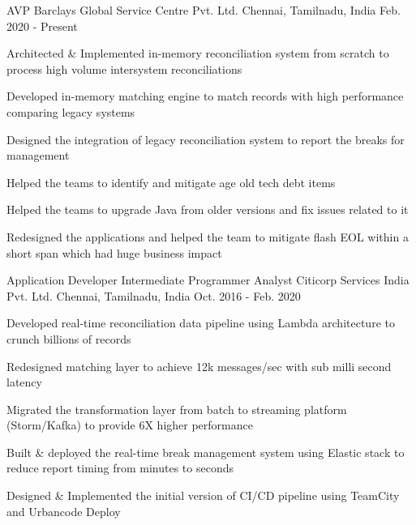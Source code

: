 

\begin{cventries}

  \cventry
    {AVP} %
    {Barclays Global Service Centre Pvt. Ltd.} %
    {Chennai, Tamilnadu, India} %
    {Feb. 2020 - Present} %
    {
      \begin{cvitems} %
        \item {Architected \& Implemented in-memory reconciliation system from scratch to process high volume intersystem reconciliations}
        \item {Developed in-memory matching engine to match records with high performance comparing legacy systems}
        \item {Designed the integration of legacy reconciliation system to report the breaks for management}
        \item {Helped the teams to identify and mitigate age old tech debt items}
        \item {Helped the teams to upgrade Java from older versions and fix issues related to it}
        \item {Redesigned the applications and helped the team to mitigate flash EOL within a short span which had huge business impact}
      \end{cvitems}
    }

  \cventry
    {Application Developer Intermediate Programmer Analyst} %
    {Citicorp Services India Pvt. Ltd.} %
    {Chennai, Tamilnadu, India} %
    {Oct. 2016 - Feb. 2020} %
    {
      \begin{cvitems} %
        \item {Developed real-time reconciliation data pipeline using Lambda architecture to crunch billions of records}
        \item {Redesigned matching layer to achieve 12k messages/sec with sub milli second latency}
        \item {Migrated the transformation layer from batch to streaming platform (Storm/Kafka) to provide 6X higher performance}
        \item {Built \& deployed the real-time break management system using Elastic stack to reduce report timing from minutes to seconds}
        \item {Designed \& Implemented the initial version of CI/CD pipeline using TeamCity and Urbancode Deploy}        
      \end{cvitems}
    }


\end{cventries}
